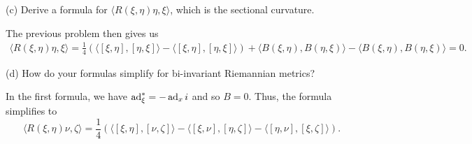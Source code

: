 \documentclass{../../templates/lkx_pset}
\begin{document}
\begin{parts}
\begin{part}{(c)}
	Derive a formula for $\langle R(\xi, \eta)\eta, \xi\rangle$, which is the sectional curvature.
\end{part}

The previous problem then gives us
\[
	\begin{aligned}
	\langle R(\xi,\eta)\eta, \xi\rangle=\frac{1}{4}\left( 
		\langle [\xi,\eta], [\eta,\xi]\rangle
		-\langle [\xi,\eta], [\eta,\xi]\rangle
\right)
+ \langle B(\xi, \eta), B(\eta,\xi)\rangle
- \langle B(\xi,\eta), B(\eta,\xi)\rangle = 0.
\end{aligned}
\]

\begin{part}{(d)}
	How do your formulas simplify for bi-invariant Riemannian metrics?
\end{part}

In the first formula, we have $\operatorname{ad}_\xi^* = -\operatorname{ad}_xi$ and so $B=0$. Thus, the formula simplifies to
\[
	\langle R(\xi,\eta)\nu, \zeta\rangle=\frac{1}{4}\left( 
		\langle [\xi,\eta], [\nu,\zeta]\rangle
		-\langle [\xi,\nu], [\eta,\zeta]\rangle
		-\langle [\eta,\nu], [\xi,\zeta]\rangle
\right).
\]
\end{parts}
\end{document}
